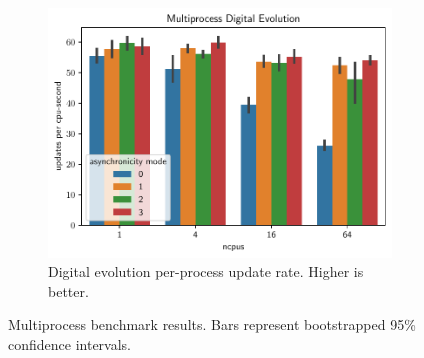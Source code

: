 \begin{figure}[thpb]
  \begin{subfigure}[b]{\linewidth}
    \centering
  \includegraphics[width=\linewidth]{chart/multiprocess-digital-evolution}
  \caption{Digital evolution per-process update rate. Higher is better.}
  \label{fig:multiprocess_digital_evolution_update_rate}
  \end{subfigure}
      
  \caption{Multiprocess benchmark results. Bars represent bootstrapped 95\% confidence intervals. }
  \label{fig:multiprocess_benchmarks}
\end{figure}